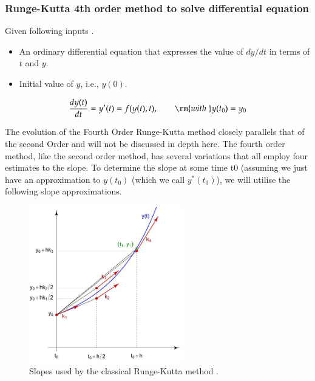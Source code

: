 \newpage

\subsubsection{Runge-Kutta 4th order method to solve differential equation}

Given following inputs \cite{RungeKut7:online}. 

\begin{itemize}
    \item An ordinary differential equation that expresses the value of $dy/dt$ in terms of $t$ and $y$.
    \item Initial value of $y$, i.e., $y(0)$. 
\end{itemize}

\begin{equation}
    {{dy(t)} \over {dt}} = y'(t) = f(y(t),t), \quad \quad {\rm{with\;}} y(t_0)=y_0
\end{equation}

The evolution of the Fourth Order Runge-Kutta method closely parallels that of the second Order and will not be discussed in depth here. The fourth order method, like the second order method, has several variations that all employ four estimates to the slope. To determine the slope at some time t0 (assuming we just have an approximation to $y(t_0)$ (which we call $y^*(t_0)$), we will utilise the following slope approximations.

 \begin{figure}[hbt!]
	\centering
	\begin{framed}
	\includegraphics[width=0.6\textwidth]{Figures/F.JPG}
		\end{framed}
	\caption{Slopes used by the classical Runge-Kutta method \cite{hossain2017comparative}.}
	\label{fig:6}
\end{figure}

